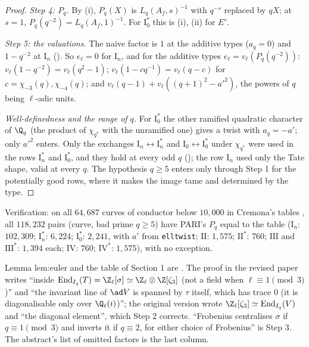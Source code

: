 \begin{proof}
\emph{Step 4: $P_q$.} By (i), $P_q(X)$ is $L_q(A_f,s)^{-1}$ with $q^{-s}$ replaced by $qX$; at $s=1$, $P_q(q^{-2})=L_q(A_f,1)^{-1}$. For $\mathrm I_0^*$ this is
(i), (ii) for $E'$.

\emph{Step 5: the valuations.} The naive factor is $1$ at the additive types ($a_q=0$) and $1-q^{-2}$ at $\mathrm I_n$ (). So $e_\ell=0$ for $\mathrm I_n$, and
for the additive types $e_\ell=v_\ell(P_q(q^{-2}))$: $v_\ell(1-q^{-2})=v_\ell(q^2-1)$; $v_\ell(1-cq^{-1})=v_\ell(q-c)$ for $c=\chi_{-3}(q),\chi_{-4}(q)$; and
$v_\ell(q-1)+v_\ell((q+1)^2-a'^2)$, the powers of $q$ being $\ell$-adic units.

\emph{Well-definedness and the range of $q$.} For $\mathrm I_0^*$ the other ramified quadratic character of $\Q_q$ (the product of $\chi_{q^*}$ with the unramified one) gives a twist
with $a_q=-a'$; only $a'^2$ enters. Only the exchanges $\mathrm I_n\leftrightarrow\mathrm I_n^*$ and $\mathrm I_0\leftrightarrow\mathrm I_0^*$ under $\chi_{q^*}$ were used in the rows $\mathrm I_n^*$ and $\mathrm I_0^*$,
and they hold at every odd $q$ (); the row $\mathrm I_n$ used only the Tate shape, valid at every $q$. The hypothesis $q\ge5$ enters only through Step 1 for the
potentially good rows, where it makes the image tame and determined by the type.
\end{proof}

Verification: on all $64{,}687$ curves of conductor below $10{,}000$ in Cremona's tables \cite{ecdata}, all $118{,}232$ pairs (curve, bad prime $q\ge5$) have PARI's $P_q$
equal to the table ($\mathrm I_n$: $102{,}309$; $\mathrm I_n^*$: $6{,}224$; $\mathrm I_0^*$: $2{,}241$, with $a'$ from \texttt{elltwist}; $\mathrm{II}$: $1{,}575$; $\mathrm{II}^*$: $760$; $\mathrm{III}$ and
$\mathrm{III}^*$: $1{,}394$ each; $\mathrm{IV}$: $760$; $\mathrm{IV}^*$: $1{,}575$), with no exception.

\begin{paperlink}
Lemma lem:euler and the table of Section 1 are . The proof in the revised paper writes ``inside $\operatorname{End}_{I_q}(T)=\Z_\ell[\sigma]\simeq\Z_\ell\otimes\Z[\zeta_3]$ (not a field
when $\ell\equiv1\pmod3$)'' and ``the invariant line of $\ad V$ is spanned by $\tau$ itself, which has trace $0$ (it is diagonalisable only over $\Q_\ell(i)$)''; the original
version wrote $\Z_\ell[\zeta_3]\simeq\operatorname{End}_{I_q}(V)$ and ``the diagonal element'', which Step 2 corrects. ``Frobenius centralises $\sigma$ if $q\equiv1\pmod3$ and inverts it if
$q\equiv2$, for either choice of Frobenius'' is Step 3. The abstract's list of omitted factors is the last column.
\end{paperlink}

